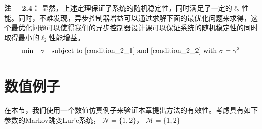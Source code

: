 	{\bf 注 \ \ 2.4：} 
	显然，上述定理保证了系统的随机稳定性，同时满足了一定的$\ell_2$性能。同时，不难发现，异步控制器增益可以通过求解下面的最优化问题来求得，这个最优化问题可以使得我们的异步控制器设计课可以保证系统的随机稳定性的同时取得最小的$\ell_2$性能增益。
	\begin{equation} \notag
	\mathrm{min}\quad \sigma \quad \mathrm{subject \ to} \ \eqref{condition_2_1} \ \mathrm{and} \ \eqref{condition_2_2} \ \mathrm{with} \ \sigma=\gamma^{2} 
	\end{equation}
	
\section{数值例子}
	在本节，我们使用一个数值仿真例子来验证本章提出方法的有效性。考虑具有如下参数的Markov跳变Lur’e系统， $\mathcal{N}=\{1,2\}$， $\mathcal{M}=\{1,2\}$ 
